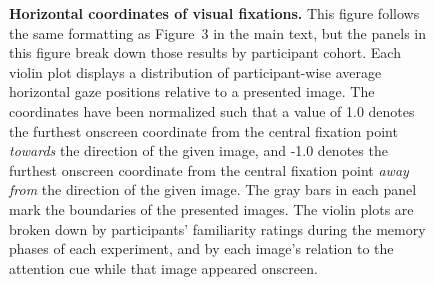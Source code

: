 \documentclass{article}
\def\rot#1{\raisebox{-1.35in}{\rotatebox{90}{#1}}}
\begin{document}
\begin{figure}[ht]
\captionsetup[subfigure]{labelformat=empty}
\rot{\rlap{\textbf{Sustained}}}
 \hfill
 \hfill

\raisebox{.05in}{\rot{\rlap{\textbf{Variable}}}}
 \hfill
 \hfill

  \caption{\textbf{Horizontal coordinates of visual fixations.}  This figure follows the same formatting as
  Figure~3 in the main text, but the panels in this figure break down
  those results by participant cohort.  Each violin plot displays a distribution of participant-wise average horizontal gaze positions relative to a presented image.  The coordinates have been normalized such that a value of 1.0 denotes the furthest onscreen coordinate from the central fixation point \textit{towards} the direction of the given image, and -1.0 denotes the furthest onscreen coordinate from the central fixation point \textit{away from} the direction of the given image.  The gray bars in each panel mark the boundaries of the presented images.  The violin plots are broken down by participants' familiarity ratings during the memory phases of each experiment, and by each image's relation to the attention cue while that image appeared onscreen. }\end{figure}
\end{document}
